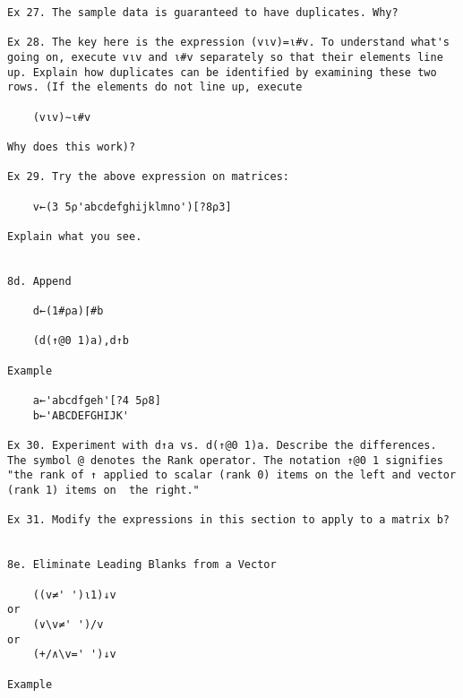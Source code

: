 \documentclass{article}
\begin{document}
\begin{verbatim}
Ex 27. The sample data is guaranteed to have duplicates. Why?         

Ex 28. The key here is the expression (v⍳v)=⍳#v. To understand what's 
going on, execute v⍳v and ⍳#v separately so that their elements line  
up. Explain how duplicates can be identified by examining these two   
rows. (If the elements do not line up, execute                        

	(v⍳v)∼⍳#v                                                            

Why does this work)?                                                  

Ex 29. Try the above expression on matrices:                          

	v←(3 5⍴'abcdefghijklmno')[?8⍴3]                                      

Explain what you see.                                                 


8d. Append                                                            

	d←(1#⍴a)⌈#b                                                          

	(d(↑@0 1)a),d↑b                                                      

Example                                                               

	a←'abcdfgeh'[?4 5⍴8]                                                 
	b←'ABCDEFGHIJK'                                                      

Ex 30. Experiment with d↑a vs. d(↑@0 1)a. Describe the differences.   
The symbol @ denotes the Rank operator. The notation ↑@0 1 signifies  
"the rank of ↑ applied to scalar (rank 0) items on the left and vector
(rank 1) items on  the right."                                        

Ex 31. Modify the expressions in this section to apply to a matrix b? 


8e. Eliminate Leading Blanks from a Vector                            

	((v≠' ')⍳1)↓v                                                        
or                                                                    
	(∨\v≠' ')/v                                                          
or                                                                    
	(+/∧\v=' ')↓v                                                        

Example                                                               


\end{verbatim}
\end{document}
